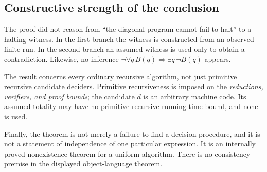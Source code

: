 \subsection{Constructive strength of the conclusion}

The proof did not reason from ``the diagonal program cannot fail to halt''
to a halting witness. In the first branch the witness is constructed from
an observed finite run. In the second branch an assumed witness is used
only to obtain a contradiction. Likewise, no inference
$\neg\forall q\,B(q)\Rightarrow\exists q\,\neg B(q)$ appears.

The result concerns every ordinary recursive algorithm, not just primitive
recursive candidate deciders. Primitive recursiveness is imposed on the
\emph{reductions, verifiers, and proof bounds}; the candidate $d$ is an
arbitrary machine code. Its assumed totality may have no primitive
recursive running-time bound, and none is used.

Finally, the theorem is not merely a failure to find a decision procedure,
and it is not a statement of independence of one particular expression.
It is an internally proved nonexistence theorem for a uniform algorithm.
There is no consistency premise in the displayed object-language theorem.
